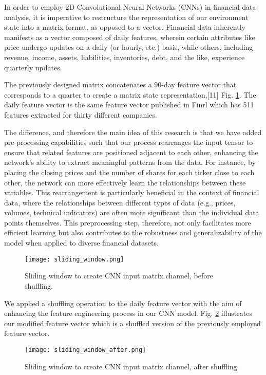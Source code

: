 {In order to employ 2D Convolutional Neural Networks (CNNs) in financial data analysis, it is imperative to restructure the representation of our environment state into a matrix format, as opposed to a vector. Financial data inherently manifests as a vector composed of daily features, wherein certain attributes like price undergo updates on a daily (or hourly, etc.) basis, while others, including revenue, income, assets, liabilities, inventories, debt, and the like, experience quarterly updates.

The previously designed matrix concatenates a 90-day feature vector that corresponds to a quarter to create a matrix state representation,[11] Fig. \ref{fig:Sliding_window}. The daily feature vector is the same feature vector published in Finrl \cite{liu2022finrl} which has 511 features extracted for thirty different companies.



The difference, and therefore the main idea of this research is that we have added pre-processing capabilities such that our process rearranges the input tensor to ensure that related features are positioned adjacent to each other, enhancing the network's ability to extract meaningful patterns from the data. For instance, by placing the closing prices and the number of shares for each ticker close to each other, the network can more effectively learn the relationships between these variables. This rearrangement is particularly beneficial in the context of financial data, where the relationships between different types of data (e.g., prices, volumes, technical indicators) are often more significant than the individual data points themselves. This preprocessing step, therefore, not only facilitates more efficient learning but also contributes to the robustness and generalizability of the model when applied to diverse financial datasets.

\begin{figure}[htbp]
\centerline
{\texttt{[image: sliding\_window.png]}}
\caption{Sliding window to create CNN input matrix channel, before shuffling.}
\label{fig:Sliding_window}
\end{figure}

We applied a shuffling operation to the daily feature vector with the aim of enhancing the feature engineering process in our CNN model. Fig. \ref{fig:Sliding_window_after} illustrates our modified feature vector which is a shuffled version of the previously employed feature vector.

\begin{figure}[htbp]
\centerline
{\texttt{[image: sliding\_window\_after.png]}}
\caption{Sliding window to create CNN input matrix channel, after shuffling.}
\label{fig:Sliding_window_after}
\end{figure}


}
